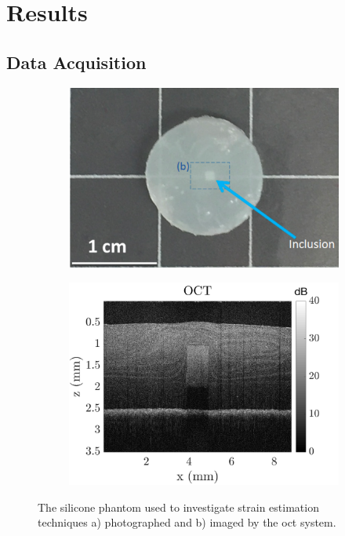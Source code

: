 \chapter{Results}\label{results}

\section{Data Acquisition}\label{data}

\begin{figure}
	\centering
	\begin{subfigure}{0.47\textwidth}
		\centering
		\includegraphics[width=\textwidth]{figures/phantom.png}
	\end{subfigure}
	\quad
	\begin{subfigure}{0.49\textwidth}
		\centering
		\includegraphics[width=\textwidth]{figures/oct.png}
	\end{subfigure}	
	\caption{The silicone phantom used to investigate strain estimation techniques a) photographed and b) imaged by the \ac{oct} system.}
	\label{oct_image}	
\end{figure}

